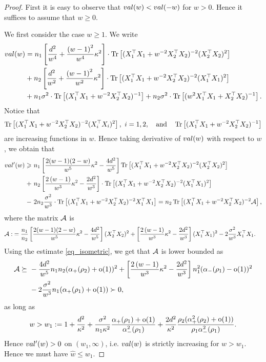 \begin{proof}
First it is easy to observe that $\val(w)< \val(-w)$ for $w> 0$. Hence it suffices to assume that $w\ge 0$.

We first consider the case $w\ge 1$. We write
\begin{align}
	\val(w) &= n_1\left[\frac{d^2}{w^4} +\frac{\left( w-1\right)^2}{w^4}\kappa^2\right]\cdot \tr\left[( X_1^{\top}X_1 +w^{-2}X_2^{\top}X_2)^{-2} (X_2^{\top}X_2)^2\right] \nonumber \\
	& + n_2\left[\frac{d^2}{w^2} +\frac{\left( w-1\right)^2}{w^2}\kappa^2\right]\cdot \tr\left[( X_1^{\top}X_1 +w^{-2}X_2^{\top}X_2)^{-2} (X_1^{\top}X_1)^2\right] \nonumber\\
			& + n_1\sigma^2  \cdot \bigtr{(X_1^{\top}X_1  + w^{-2}X_2^{\top}X_2)^{-1} }+ n_2\sigma^2 \cdot \bigtr{(w^2X_1^{\top}X_1  + X_2^{\top}X_2)^{-1} }.\nonumber%
\end{align}
Notice that 
$$\tr\left[( X_1^{\top}X_1 +w^{-2}X_2^{\top}X_2)^{-2} (X_i^{\top}X_i)^2\right],\ i=1,2, \quad \text{and} \quad \bigtr{(X_1^{\top}X_1  + w^{-2}X_2^{\top}X_2)^{-1} }$$
are increasing functions in $w$. Hence taking derivative of $\val(w)$ with respect to $w$, we obtain that
\begin{align*}
\val'(w) \ge &~ n_1\left[ \frac{2(w-1)(2-w)}{w^5}\kappa^2 - \frac{4d^2}{w^5}\right] \tr\left[( X_1^{\top}X_1 +w^{-2}X_2^{\top}X_2)^{-2} (X_2^{\top}X_2)^2\right]   \\
+&~ n_2\left[\frac{2\left( w-1\right)}{w^3}\kappa^2 - \frac{2d^2}{w^3} \right]\cdot \tr\left[( X_1^{\top}X_1 +w^{-2}X_2^{\top}X_2)^{-2} (X_1^{\top}X_1)^2\right] \nonumber\\
		-&~ 2 n_2 \frac{\sigma^2}{w^3} \cdot \bigtr{(X_1^{\top}X_1 + w^{-2}X_2^{\top}X_2)^{-2} X_1^\top X_1  } = n_2 \bigtr{(X_1^{\top}X_1 + w^{-2}X_2^{\top}X_2)^{-2} \cal A },
\end{align*}
where the matrix $\cal A$ is
\begin{align*}
\cal A :&= \frac{n_1}{n_2}\left[ \frac{2(w-1)(2-w)}{w^5}\kappa^2 - \frac{4d^2}{w^5}\right](X_2^{\top}X_2)^2 + \left[\frac{2\left( w-1\right)}{w^3}\kappa^2 - \frac{2d^2}{w^3} \right](X_1^{\top}X_1)^2 - 2 \frac{\sigma^2}{w^3}X_1^\top X_1.
\end{align*}
Using the estimate \eqref{eq_isometric}, we get that $\cal A$ is lower bounded as
\begin{align*}
\cal A \succeq&~ - \frac{4d^2}{w^5}n_1n_2 (\al_+(\rho_2)+\oo(1))^2 + \left[\frac{2\left( w-1\right)}{w^3}\kappa^2 - \frac{2d^2}{w^3} \right]n_1^2 (\al_-(\rho_1)-\oo(1))^2 \\
&~ - 2 \frac{\sigma^2}{w^3}n_1(\al_{+}(\rho_1)+\oo(1)) \succ 0,
\end{align*}
as long as
$$w> w_1:=1 +\frac{d^2}{\kappa^2}+ \frac{\sigma^2}{n_1\kappa^2}\frac{\al_{+}(\rho_1)+\oo(1)}{\al_{-}^2(\rho_1)} + \frac{2d^2}{\kappa^2}\frac{\rho_2(\al_+^2(\rho_2)+\oo(1))}{\rho_1\al_-^2(\rho_1) }.$$
Hence $\val'(w)>0$ on $(w_1,\infty)$, i.e. $\val(w)$ is strictly increasing for $w>w_1$. Hence we must have $\hat w\le w_1$. 


\end{proof}
